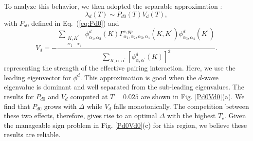\documentclass[reprint,nofootinbib,nobibnotes,amsmath,amssymb,aps,prb,floatfix]{revtex4-2}
\newcommand{\beq}{\begin{equation}}
\newcommand{\eeq}{\end{equation}}
\newcommand{\figdisp}[1]{Fig. \ref{#1}}
\begin{document}
To analyze this behavior, we then adopted the separable approximation \cite{maier6,maier5}:
\beq\nonumber
\lambda_d(T) \sim P_{d0}(T) V_d(T),
\eeq
 with $P_{d0}$ defined in Eq.~(\ref{eq:Pd0}) and
\beq\nonumber
V_d = -\frac{\sum_{\substack{K,K^\prime \\ \alpha_1 \dots \alpha_4 }} \phi^d_{\alpha_1,\alpha_2}(K)\Gamma^{c,pp}_{\alpha_1,\alpha_2,\alpha_3,\alpha_4}(K,K^\prime) \phi^d_{\alpha_3,\alpha_4}(K^\prime)}{\sum_{K,\alpha,\alpha^\prime} [\phi^d_{\alpha,\alpha^\prime}(K)]^2 }.
\eeq
representing the strength of the effective pairing interaction. Here, we use the leading eigenvector for $\phi^d$. This approximation is good when the $d$-wave eigenvalue is dominant and well separated from the sub-leading eigenvalues. The results for $P_{d0}$ and $V_d$ computed at $T=0.025$ are shown in \figdisp{Pd0Vd0}(a). We find that $P_{d0}$ grows with $\Delta$ while $V_d$ falls monotonically. The competition between these two effects, therefore, gives rise to an optimal $\Delta$ with the highest $T_c$. Given the manageable sign problem in \figdisp{Pd0Vd0}(c) for this region, we believe these results are reliable.
\end{document}
